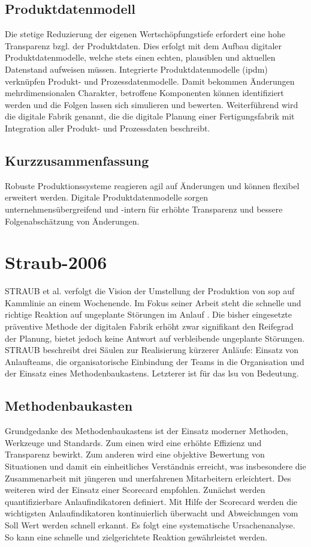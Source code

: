 \subsection{Produktdatenmodell}
Die stetige Reduzierung der eigenen Wertschöpfungstiefe erfordert eine hohe Transparenz bzgl. der Produktdaten. Dies erfolgt mit dem Aufbau digitaler Produktdatenmodelle, welche stets einen echten, plausiblen und aktuellen Datenstand aufweisen müssen. 
Integrierte Produktdatenmodelle (\gls{ipdm})
verknüpfen Produkt- und Prozessdatenmodelle. Damit bekommen Änderungen mehrdimensionalen Charakter, betroffene Komponenten können identifiziert werden und die Folgen lassen sich simulieren und bewerten. 
Weiterführend wird die digitale Fabrik genannt, die die digitale Planung einer Fertigungsfabrik mit Integration aller Produkt- und Prozessdaten beschreibt. 

\subsection{Kurzzusammenfassung}
Robuste Produktionssysteme reagieren agil auf Änderungen und können flexibel erweitert werden. Digitale Produktdatenmodelle sorgen unternehmensübergreifend und -intern für erhöhte Transparenz und bessere Folgenabschätzung von Änderungen. 

\section{Straub-2006}

STRAUB et al. verfolgt die Vision der Umstellung der Produktion von \gls{sop} 
auf Kammlinie an einem Wochenende. Im Fokus seiner Arbeit steht die schnelle und richtige Reaktion auf ungeplante Störungen im Anlauf \cite{Straub2006}. Die bisher eingesetzte präventive Methode der digitalen Fabrik erhöht zwar signifikant den Reifegrad der Planung, bietet jedoch keine Antwort auf verbleibende ungeplante Störungen. STRAUB beschreibt drei Säulen zur Realisierung kürzerer Anläufe: Einsatz von Anlaufteams, die organisatorische Einbindung der Teams in die Organisation und der Einsatz eines Methodenbaukastens. Letzterer ist für das \gls{lsu} von Bedeutung. 

\subsection{Methodenbaukasten}

Grundgedanke des Methodenbaukastens ist der Einsatz moderner Methoden, Werkzeuge und Standards.
Zum einen wird eine erhöhte Effizienz und Transparenz bewirkt. Zum anderen wird eine objektive Bewertung von Situationen und damit ein einheitliches Verständnis erreicht, was insbesondere die Zusammenarbeit mit jüngeren und unerfahrenen Mitarbeitern erleichtert. 
Des weiteren wird der Einsatz einer Scorecard empfohlen. %
Zunächst werden quantifizierbare Anlaufindikatoren definiert. Mit Hilfe der Scorecard werden die wichtigsten Anlaufindikatoren kontinuierlich überwacht und Abweichungen vom Soll Wert werden schnell erkannt. Es folgt eine systematische Ursachenanalyse. So kann eine schnelle und zielgerichtete Reaktion gewährleistet werden. 

